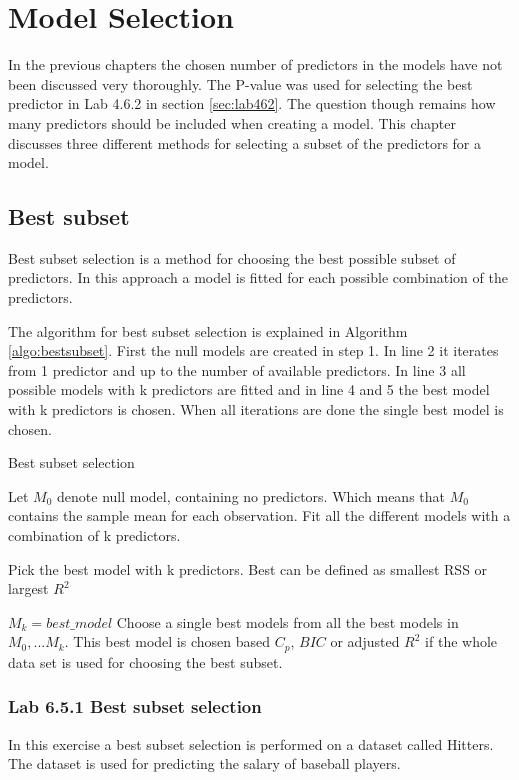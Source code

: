 \chapter{Model Selection}
\label{chp:subsel}

In the previous chapters the chosen number of predictors in the models have not been discussed very thoroughly. The P-value was used for selecting the best predictor in Lab 4.6.2 in section \ref{sec:lab462}. The question though remains how many predictors should be included when creating a model. This chapter discusses three different methods for selecting a subset of the predictors for a model.

\section{Best subset}
Best subset selection is a method for choosing the best possible subset of predictors. In this approach a model is fitted for each possible combination of the predictors.

The algorithm for best subset selection is explained in Algorithm \ref{algo:bestsubset}. First the null models are created in step 1. In line 2 it iterates from 1 predictor and up to the number of available predictors. In line 3 all possible models with k predictors are fitted and in line 4 and 5 the best model with k predictors is chosen. When all iterations are done the single best model is chosen.

\begin{algorithm}
	\caption{Best subset selection}
	\label{algo:bestsubset}
	\begin{algorithmic}[1]
		\State Let $M_0$ denote null model, containing no predictors. Which means that $M_0$ contains the sample mean for each observation.
		\State Fit all the different models with a combination of k predictors.
		\State \parbox[t]{\dimexpr\linewidth-\algorithmicindent}{Pick the best model with k predictors. Best can be defined as smallest RSS or largest $R^2$}
		\State $M_k = best\_model$
		\EndFor
		\State Choose a single best models from all the best models in $M_0,...M_k$. This best model is chosen based $C_p$, $BIC$ or adjusted $R^2$ if the whole data set is used for choosing the best subset.
	\end{algorithmic}
\end{algorithm}


\subsection{Lab 6.5.1 Best subset selection}
In this exercise a best subset selection is performed on a dataset called Hitters. The dataset is used for predicting the salary of baseball players.

